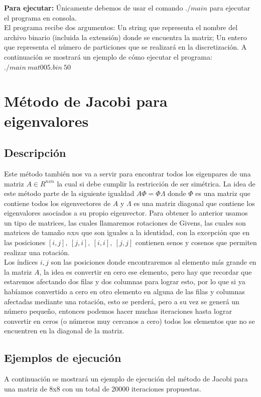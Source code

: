\documentclass[12pt]{article}
\begin{document}
\textbf{Para ejecutar:} Únicamente debemos de usar el comando $./main$ para ejecutar el programa en consola.\\
El programa recibe dos argumentos: Un string que representa el nombre del archivo binario (incluida la extensión) donde se encuentra la matriz; Un entero que representa el número de particiones que se realizará en la discretización. A continuación se mostrará un ejemplo de cómo ejecutar el programa:\\

$./main\ mat005.bin\ 50$

\section{Método de Jacobi para eigenvalores}

\subsection{Descripción}
Este método también nos va a servir para encontrar todos los eigenpares de una matriz $A \in R^{nxn}$ la cual si debe cumplir la restricción de ser simétrica. La idea de este método parte de la siguiente igualdad $A\Phi = \Phi\Lambda$ donde $\Phi$ es una matriz que contiene todos los eigenvectores de $A$ y $\Lambda$ es una matriz diagonal que contiene los eigenvalores asociados a su propio eigenvector. Para obtener lo anterior usamos un tipo de matrices, las cuales llamaremos rotaciones de Givens, las cuales son matrices de tamaño $n$x$n$ que son iguales a la identidad, con la excepción que en las posiciones $[i,j],\ [j,i],\ [i,i],\ [j,j]$ contienen senos y cosenos que permiten realizar una rotación.\\
Los índices $i,j$ son las posiciones donde encontraremos al elemento más grande en la matriz $A$, la idea es convertir en cero ese elemento, pero hay que recordar que estaremos afectando dos filas y dos columnas para lograr esto, por lo que si ya habíamos convertido a cero en otro elemento en alguna de las filas y columnas afectadas mediante una rotación, esto se perderá, pero a su vez se generá un número pequeño, entonces podemos hacer muchas iteraciones hasta lograr convertir en ceros (o números muy cercanos a cero) todos los elementos que no se encuentren en la diagonal de la matriz.

\subsection{Ejemplos de ejecución}
A continuación se mostrará un ejemplo de ejecución del método de Jacobi para una matriz de 8x8 con un total de 20000 iteraciones propuestas.\\
\end{document}
